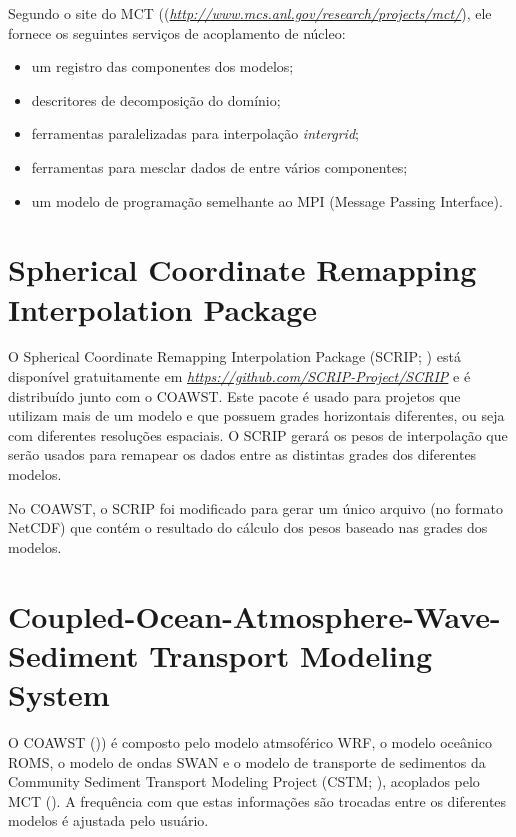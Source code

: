 \noindent Segundo o site do MCT ((\textcolor{bleu_cite}{\href{http://www.mcs.anl.gov/research/projects/mct/}{\textit{http://www.mcs.anl.gov/research/projects/mct/}}}), 
          ele fornece os seguintes serviços de acoplamento de núcleo:
\bigskip

\begin{itemize}
\item um registro das componentes dos modelos;
\item descritores de decomposição do domínio;
\item ferramentas paralelizadas para interpolação \textit{intergrid};
\item ferramentas para mesclar dados de entre vários componentes;
\item um modelo de programação semelhante ao MPI (Message Passing Interface).
\end{itemize}
\bigskip

\section{Spherical Coordinate Remapping Interpolation Package}\label{scripsecao}
\bigskip

\noindent O  Spherical Coordinate Remapping Interpolation Package (SCRIP; \cite{Jones1999,Jones1998}) 
          está disponível gratuitamente em \textcolor{bleu_cite}{\href{https://github.com/SCRIP-Project/SCRIP}{\textit{https://github.com/SCRIP-Project/SCRIP}}} 
          e é distribuído junto com o COAWST. Este pacote é usado para projetos que utilizam mais de um modelo e que possuem grades 
          horizontais diferentes, ou seja com diferentes resoluções espaciais. O SCRIP gerará os pesos de interpolação que serão 
          usados para remapear os dados entre as distintas grades dos diferentes modelos.
\bigskip

\noindent No COAWST, o SCRIP foi modificado para gerar um único arquivo (no formato NetCDF) que contém o resultado do cálculo 
          dos pesos baseado nas grades dos modelos.

\bigskip

\section{Coupled-Ocean-Atmosphere-Wave-Sediment Transport Modeling System}\label{coawstsecao}
\bigskip
\noindent O COAWST ()\cite{Warner2010,Warner2008})
          é composto pelo modelo atmsoférico WRF, o modelo oceânico ROMS, o modelo de ondas SWAN e o modelo de transporte de sedimentos
          da Community Sediment Transport Modeling Project (CSTM; \cite{Warner2008}), acoplados pelo MCT (\cite{Warner2010,Warner2008}). 
          A frequência com que estas informações são trocadas entre os diferentes modelos é ajustada pelo usuário.
\bigskip

